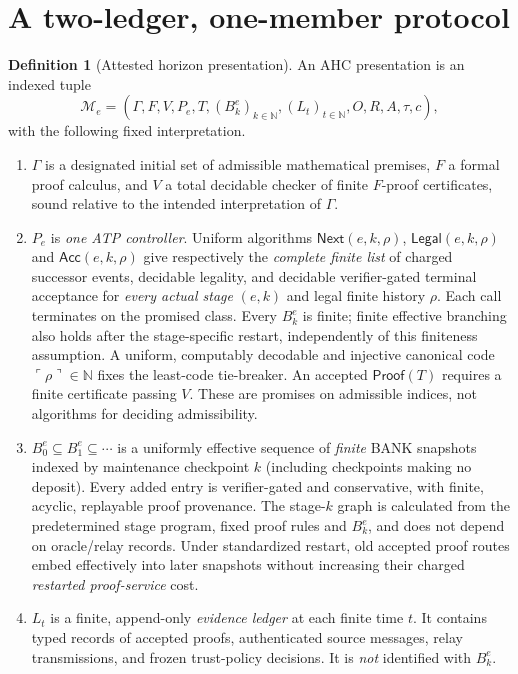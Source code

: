 \documentclass[11pt,letterpaper]{article}
\theoremstyle{definition}
\newtheorem{definition}[theorem]{Definition}
\theoremstyle{remark}
\newcommand{\N}{\mathbb N}
\newcommand{\Acc}{\mathsf{Acc}}
\newcommand{\Next}{\mathsf{Next}}
\newcommand{\Proof}{\mathsf{Proof}}
\begin{document}
\section{A two-ledger, one-member protocol}
\begin{definition}[Attested horizon presentation]
An AHC presentation is an indexed tuple
\[
\mathcal M_e=(\Gamma,F,V,P_e,T,(B^e_k)_{k\in\N},(L_t)_{t\in\N},O,R,A,\tau,c),
\]
with the following fixed interpretation.
\begin{enumerate}[label=(\roman*)]
\item $\Gamma$ is a designated initial set of admissible mathematical premises, $F$ a formal proof calculus, and $V$ a total decidable checker of finite $F$-proof certificates, sound relative to the intended interpretation of $\Gamma$.
\item $P_e$ is \emph{one ATP controller}. Uniform algorithms $\Next(e,k,\rho)$, $\mathsf{Legal}(e,k,\rho)$ and $\Acc(e,k,\rho)$ give respectively the \emph{complete finite list} of charged successor events, decidable legality, and decidable verifier-gated terminal acceptance for \emph{every actual stage} $(e,k)$ and legal finite history $\rho$. Each call terminates on the promised class. Every $B^e_k$ is finite; finite effective branching also holds after the stage-specific restart, independently of this finiteness assumption. A uniform, computably decodable and injective canonical code $\ulcorner\rho\urcorner\in\N$ fixes the least-code tie-breaker. An accepted $\Proof(T)$ requires a finite certificate passing $V$. These are promises on admissible indices, not algorithms for deciding admissibility.
\item $B_0^e\subseteq B_1^e\subseteq\cdots$ is a uniformly effective sequence of \emph{finite} BANK snapshots indexed by maintenance checkpoint $k$ (including checkpoints making no deposit). Every added entry is verifier-gated and conservative, with finite, acyclic, replayable proof provenance. The stage-$k$ graph is calculated from the predetermined stage program, fixed proof rules and $B_k^e$, and does not depend on oracle/relay records. Under standardized restart, old accepted proof routes embed effectively into later snapshots without increasing their charged \emph{restarted proof-service} cost.
\item $L_t$ is a finite, append-only \emph{evidence ledger} at each finite time $t$. It contains typed records of accepted proofs, authenticated source messages, relay transmissions, and frozen trust-policy decisions. It is \emph{not} identified with $B_k^e$.

\end{enumerate}
\end{definition}
\end{document}

